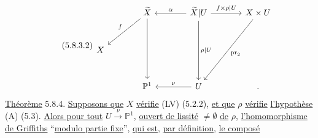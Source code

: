 \begin{equation}\tag{5.8.3.2}
\begin{tikzcd}[row sep=large, column sep=large]
 {} & \widetilde{X} \arrow[dl, "f"'] \arrow[dd] & \widetilde{X}|U \arrow[l, "\alpha"'] \arrow[r, "f\times\rho|U"] \arrow[dd, "\rho|U"] & X\times U \arrow[ddl, "\mathrm{pr}_2"] \\
X & {} & {} & {} \\
 {} & \mathbb{P}^1 & U \arrow[l, "\nu"'] & .
\end{tikzcd}
\end{equation}
\underline{Théorème} 5.8.4. \underline{Supposons que} $X$ \underline{vérifie} (LV) (5.2.2), \underline{et que} $\rho$ \underline{vérifie} \underline{l'hypothèse} (A) (5.3). \underline{Alors pour tout} $U \xrightarrow{\ \nu\ } \mathbb{P}^1$, \underline{ouvert de lissité} $\neq \emptyset$ \underline{de} $\rho$, \underline{l'homomorphisme de Griffiths} ``\underline{modulo partie fixe}'', \underline{qui est}, \underline{par définition}, \underline{le composé}

